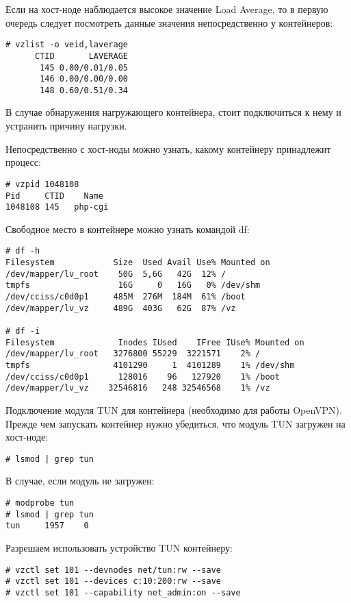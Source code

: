 Если на хост-ноде наблюдается высокое значение Load Average, то в первую очередь следует посмотреть данные значения непосредственно у контейнеров:
\begin{lstlisting}
# vzlist -o veid,laverage
      CTID       LAVERAGE
       145 0.00/0.01/0.05
       146 0.00/0.00/0.00
       148 0.60/0.51/0.34
\end{lstlisting}

В случае обнаружения нагружающего контейнера, стоит подключиться к нему и устранить причину нагрузки.

Непосредственно с хост-ноды можно узнать, какому контейнеру принадлежит процесс:
\begin{lstlisting}
# vzpid 1048108
Pid	    CTID	Name
1048108	145	  php-cgi
\end{lstlisting}

Свободное место в контейнере можно узнать командой df:
\begin{lstlisting}
# df -h
Filesystem            Size  Used Avail Use% Mounted on
/dev/mapper/lv_root    50G  5,6G   42G  12% /
tmpfs                  16G     0   16G   0% /dev/shm
/dev/cciss/c0d0p1     485M  276M  184M  61% /boot
/dev/mapper/lv_vz     489G  403G   62G  87% /vz

# df -i
Filesystem             Inodes IUsed    IFree IUse% Mounted on
/dev/mapper/lv_root   3276800 55229  3221571    2% /
tmpfs                 4101290     1  4101289    1% /dev/shm
/dev/cciss/c0d0p1      128016    96   127920    1% /boot
/dev/mapper/lv_vz    32546816   248 32546568    1% /vz
\end{lstlisting}

Подключение модуля TUN для контейнера (необходимо для работы OpenVPN).
Прежде чем запускать контейнер нужно убедиться, что модуль TUN загружен на хост-ноде:
\begin{lstlisting}
# lsmod | grep tun
\end{lstlisting}

В случае, если модуль не загружен:
\begin{lstlisting}
# modprobe tun
# lsmod | grep tun
tun     1957    0
\end{lstlisting}

Разрешаем использовать устройство TUN контейнеру:
\begin{lstlisting}
# vzctl set 101 --devnodes net/tun:rw --save
# vzctl set 101 --devices c:10:200:rw --save
# vzctl set 101 --capability net_admin:on --save
\end{lstlisting}

